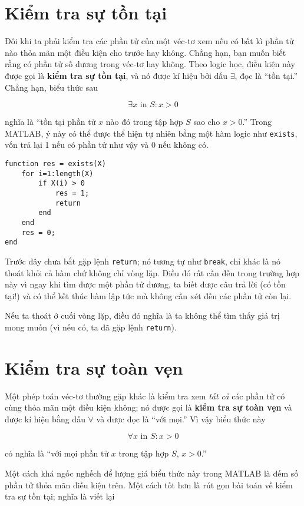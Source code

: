 \documentclass[12pt]{book}
\begin{document}
\section{Kiểm tra sự tồn tại}

Đôi khi ta phải kiểm tra các phần tử của một véc-tơ xem nếu có
bất kì phần tử nào thỏa mãn một điều kiện cho trước hay không.
Chẳng hạn, bạn muốn biết rằng có phần tử số dương trong véc-tơ
hay không. Theo logic học, điều kiện này được gọi là 
{\bf kiểm tra sự tồn tại}, và nó được kí hiệu bởi dấu $\exists$, 
đọc là ``tồn tại.''  Chẳng hạn, biểu thức sau

\[ \exists x \mbox{~in~} S: x>0 \]

\noindent nghĩa là ``tồn tại phần tử $x$ nào đó trong tập hợp $S$ sao cho
$x>0$.''  Trong MATLAB, ý này có thể được thể hiện tự nhiên bằng
một hàm logic như {\tt exists}, vốn trả lại 1 nếu có phần tử như vậy
và 0 nếu không có.

\begin{verbatim}
function res = exists(X)
    for i=1:length(X)
        if X(i) > 0
            res = 1;
            return
        end
    end
    res = 0;
end
\end{verbatim}
%
Trước đây chưa bắt gặp lệnh {\tt return}; nó tương tự như 
{\tt break}, chỉ khác là nó thoát khỏi cả hàm chứ không chỉ vòng lặp.
Điều đó rất cần đến trong trường hợp này vì ngay khi tìm được một
phần tử dương, ta biết được câu trả lời (có tồn tại!) và có thể
kết thúc hàm lập tức mà không cần xét đến các phần tử còn lại.

Nếu ta thoát ở cuối vòng lặp, điều đó nghĩa là ta không thể tìm
thấy giá trị mong muốn (vì nếu có, ta đã gặp lệnh {\tt return}).



\section{Kiểm tra sự toàn vẹn}

Một phép toán véc-tơ thường gặp khác là kiểm tra xem {\em tất cả}
các phần tử có cùng thỏa mãn một điều kiện không; nó được gọi là
{\bf kiểm tra sự toàn vẹn} và được kí hiệu bằng dấu $\forall$ và
được đọc là ``với mọi.''  Vì vậy biểu thức này

\[ \forall x \mbox{~in~} S: x>0 \]

\noindent có nghĩa là ``với mọi phần tử $x$ trong tập hợp $S$, $x>0$.''

Một cách khá ngốc nghếch để lượng giá biểu thức này trong MATLAB
là đếm số phần tử thỏa mãn điều kiện trên. Một cách tốt hơn là
rút gọn bài toán về kiểm tra sự tồn tại; nghĩa là viết lại
\end{document}
